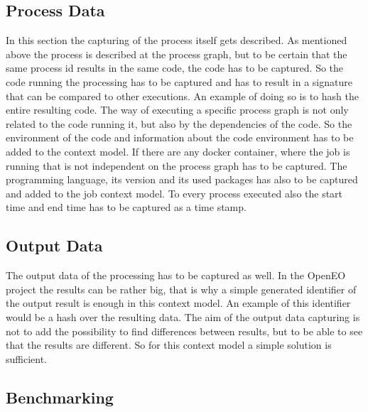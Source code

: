 \documentclass[draft,final]{vutinfth} %
\begin{document}
\subsection{Process Data}
In this section the capturing of the process itself gets described. As mentioned above the process is described at the process graph, but to be certain that the same process id results in the same code, the code has to be captured. So the code running the processing has to be captured and has to result in a signature that can be compared to other executions. An example of doing so is to hash the entire resulting code. 
The way of executing a specific process graph is not only related to the code running it, but also by the dependencies of the code. So the environment of the code and information about the code environment has to be added to the context model. If there are any docker container, where the job is running that is not independent on the process graph has to be captured. The programming language, its version and its used packages has also to be captured and added to the job context model. To every process executed also the start time and end time has to be captured as a time stamp.


\subsection{Output Data}
The output data of the processing has to be captured as well. In the OpenEO project the results can be rather big, that is why a simple generated identifier of the output result is enough in this context model. An example of this identifier would be a hash over the resulting data. The aim of the output data capturing is not to add the possibility to find differences between results, but to be able to see that the results are different. So for this context model a simple solution is sufficient. 

\subsection{Benchmarking}
\end{document}
